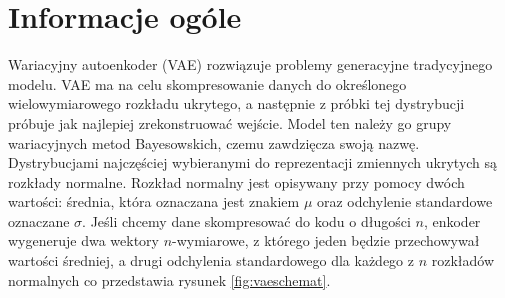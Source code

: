 \documentclass[a4paper,12pt,oneside]{book} %
\begin{document}
\section{Informacje ogóle}
Wariacyjny autoenkoder (VAE) rozwiązuje problemy generacyjne tradycyjnego modelu. VAE ma na celu skompresowanie danych do określonego wielowymiarowego rozkładu ukrytego, a następnie z próbki tej dystrybucji próbuje jak najlepiej zrekonstruować wejście. Model ten należy go grupy wariacyjnych metod Bayesowskich, czemu zawdzięcza swoją nazwę. Dystrybucjami najczęściej wybieranymi do reprezentacji zmiennych ukrytych są rozkłady normalne. Rozkład normalny jest opisywany przy pomocy dwóch wartości: średnia, która oznaczana jest znakiem $\mu$ oraz odchylenie standardowe oznaczane $\sigma$. Jeśli chcemy dane skompresować do kodu o długości $n$, enkoder wygeneruje dwa wektory $n$-wymiarowe, z którego jeden będzie przechowywał wartości średniej, a drugi odchylenia standardowego dla każdego z $n$ rozkładów normalnych co przedstawia rysunek \ref{fig:vaeschemat}.
\end{document}
